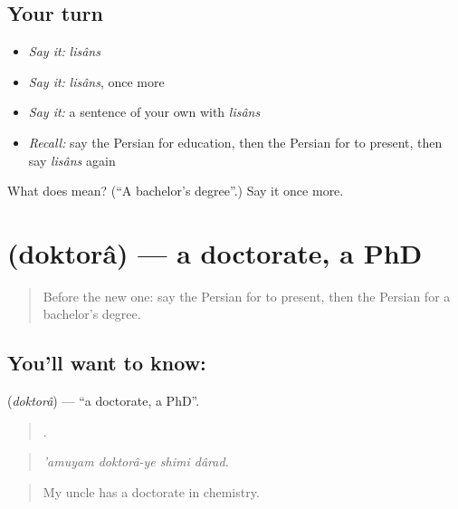 \subsection*{Your turn}
\begin{itemize}
\raggedright
  \item \emph{Say it:} \emph{lisâns}
  \item \emph{Say it:} \emph{lisâns}, once more
  \item \emph{Say it:} a sentence of your own with \emph{lisâns}
  \item \emph{Recall:} say the Persian for education, then the Persian for to present, then say \emph{lisâns} again
\end{itemize}

\begin{tcolorbox}[breakable,colback=teal!4,colframe=teal!35!black,title={Before you move on}]
What does  mean? (\textquotedblleft{}A bachelor's degree\textquotedblright{}.) Say it once more.
\end{tcolorbox}
\section[\texorpdfstring{\fa{دکترا} (doktorâ)}{دکترا (doktorâ)}]{ (doktorâ) — a doctorate, a PhD}

\label{lesson:FA-C403-doktora}



\begin{quote}
Before the new one: say the Persian for to present, then the Persian for a bachelor's degree.
\end{quote}

\subsection*{You'll want to know: }
\textbf{} (\emph{doktorâ}) — \textquotedblleft{}a doctorate, a PhD\textquotedblright{}.

\begin{quote}
   .
\end{quote}

\begin{quote}
\emph{'amuyam doktorâ-ye shimi dârad.}
\end{quote}

\begin{quote}
My uncle has a doctorate in chemistry.
\end{quote}

